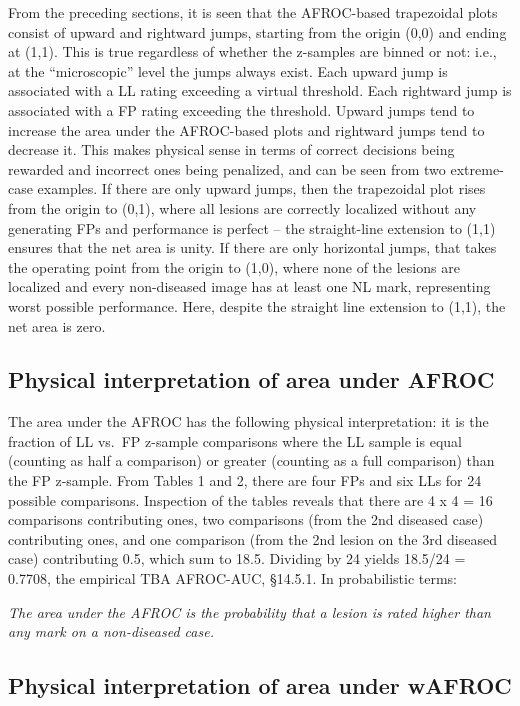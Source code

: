 \documentclass[
]{book}
\begin{document}
From the preceding sections, it is seen that the AFROC-based trapezoidal plots consist of upward and rightward jumps, starting from the origin (0,0) and ending at (1,1). This is true regardless of whether the z-samples are binned or not: i.e., at the ``microscopic'' level the jumps always exist. Each upward jump is associated with a LL rating exceeding a virtual threshold. Each rightward jump is associated with a FP rating exceeding the threshold. Upward jumps tend to increase the area under the AFROC-based plots and rightward jumps tend to decrease it. This makes physical sense in terms of correct decisions being rewarded and incorrect ones being penalized, and can be seen from two extreme-case examples. If there are only upward jumps, then the trapezoidal plot rises from the origin to (0,1), where all lesions are correctly localized without any generating FPs and performance is perfect -- the straight-line extension to (1,1) ensures that the net area is unity. If there are only horizontal jumps, that takes the operating point from the origin to (1,0), where none of the lesions are localized and every non-diseased image has at least one NL mark, representing worst possible performance. Here, despite the straight line extension to (1,1), the net area is zero.

\hypertarget{physical-interpretation-of-area-under-afroc}{%
\subsection{Physical interpretation of area under AFROC}\label{physical-interpretation-of-area-under-afroc}}

The area under the AFROC has the following physical interpretation: it is the fraction of LL vs.~FP z-sample comparisons where the LL sample is equal (counting as half a comparison) or greater (counting as a full comparison) than the FP z-sample. From Tables 1 and 2, there are four FPs and six LLs for 24 possible comparisons. Inspection of the tables reveals that there are 4 x 4 = 16 comparisons contributing ones, two comparisons (from the 2nd diseased case) contributing ones, and one comparison (from the 2nd lesion on the 3rd diseased case) contributing 0.5, which sum to 18.5. Dividing by 24 yields 18.5/24 = 0.7708, the empirical TBA AFROC-AUC, §14.5.1. In probabilistic terms:

\emph{The area under the AFROC is the probability that a lesion is rated higher than any mark on a non-diseased case.}

\hypertarget{physical-interpretation-of-area-under-wafroc}{%
\subsection{Physical interpretation of area under wAFROC}\label{physical-interpretation-of-area-under-wafroc}}
\end{document}
